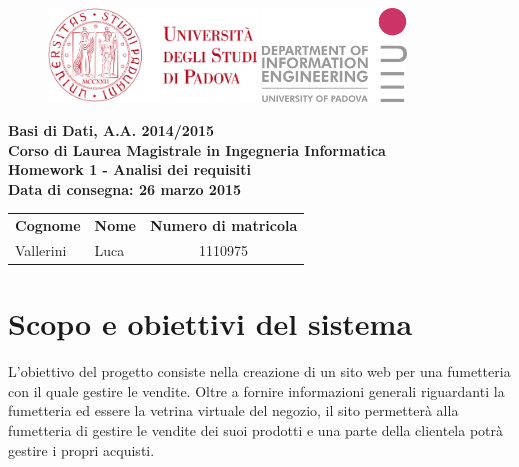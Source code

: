 \documentclass[a4paper]{scrartcl}
\newcommand{\corso}{Basi di Dati}
\newcommand{\anac}{ A.A. 2014/2015}
\newcommand{\laurea}{Corso di Laurea Magistrale in Ingegneria Informatica}
\newcommand{\matricola}{1110975}
\newcommand{\nome}{Luca}
\newcommand{\cognome}{Vallerini}
\newcommand{\data}{Data di consegna: 26 marzo 2015}
\newcommand{\consegna}{Homework 1 - Analisi dei requisiti}
\begin{document}
\begin{figure}
	\begin{minipage}[t]{\textwidth}
		\includegraphics[height=25mm]{img/logounipd}
		\hfill
		\includegraphics[height=25mm]{img/logodei}
	\end{minipage}
\end{figure}

{

\vspace{5pt}
\centering
\textbf{\corso ,\anac} \\
\textbf{\laurea} \\
\vspace{15pt}
\textbf{\consegna} \\
\textbf{\small\data}


\vspace{5pt}
\begin{table}[h]
	\begin{tabularx}{\textwidth}{|X|X|c|}
		\hline
		\multicolumn{1}{|c|}{\textbf{Cognome}} &
		\multicolumn{1}{c|}{\textbf{Nome}} &
		\multicolumn{1}{c|}{\textbf{Numero di matricola}} \\
		\centering\cognome &
		\centering\nome &
		\matricola \\
		\hline
	\end{tabularx}
\end{table}

}

\section*{Scopo e obiettivi del sistema}
L'obiettivo del progetto consiste nella creazione di un sito web per una fumetteria con il quale gestire le vendite. Oltre a fornire informazioni generali riguardanti la fumetteria ed essere la vetrina virtuale del negozio, il sito permetterà alla fumetteria di gestire le vendite dei suoi prodotti e una parte della clientela potrà gestire i propri acquisti. 
\end{document}
